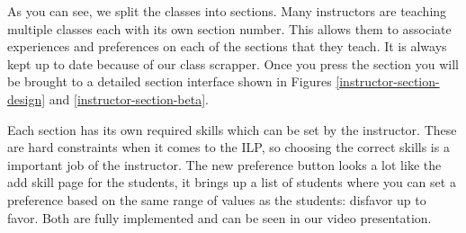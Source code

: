 As you can see, we split the classes into sections.
Many instructors are teaching multiple classes each with its own section number.
This allows them to associate experiences and preferences on each of the sections that they teach.
It is always kept up to date because of our class scrapper.
Once you press the section you will be brought to a detailed section interface shown in Figures \ref{instructor-section-design} and \ref{instructor-section-beta}.

Each section has its own required skills which can be set by the instructor.
These are hard constraints when it comes to the ILP, so choosing the correct skills is a important job of the instructor.
The new preference button looks a lot like the add skill page for the students, it brings up a list of students where you can set a preference based on the same range of values as the students: disfavor up to favor.
Both are fully implemented and can be seen in our video presentation.
